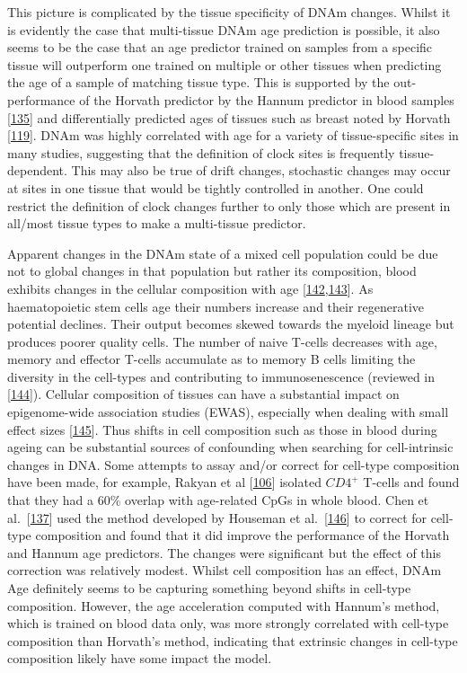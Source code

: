 \documentclass[
]{book}
\begin{document}
This picture is complicated by the tissue specificity of DNAm changes.
Whilst it is evidently the case that multi-tissue DNAm age prediction is possible, it also seems to be the case that an age predictor trained on samples from a specific tissue will outperform one trained on multiple or other tissues when predicting the age of a sample of matching tissue type.
This is supported by the out-performance of the Horvath predictor by the Hannum predictor in blood samples {[}\protect\hyperlink{ref-Marioni2015}{135}{]} and differentially predicted ages of tissues such as breast noted by Horvath {[}\protect\hyperlink{ref-Horvath2013}{119}{]}.
DNAm was highly correlated with age for a variety of tissue-specific sites in many studies, suggesting that the definition of clock sites is frequently tissue-dependent.
This may also be true of drift changes, stochastic changes may occur at sites in one tissue that would be tightly controlled in another.
One could restrict the definition of clock changes further to only those which are present in all/most tissue types to make a multi-tissue predictor.

Apparent changes in the DNAm state of a mixed cell population could be due not to global changes in that population but rather its composition, blood exhibits changes in the cellular composition with age {[}\protect\hyperlink{ref-Rimmele2014}{142},\protect\hyperlink{ref-Izzo2020}{143}{]}.
As haematopoietic stem cells age their numbers increase and their regenerative potential declines.
Their output becomes skewed towards the myeloid lineage but produces poorer quality cells.
The number of naive T-cells decreases with age, memory and effector T-cells accumulate as to memory B cells limiting the diversity in the cell-types and contributing to immunosenescence (reviewed in {[}\protect\hyperlink{ref-Geiger2013}{144}{]}).
Cellular composition of tissues can have a substantial impact on epigenome-wide association studies (EWAS), especially when dealing with small effect sizes {[}\protect\hyperlink{ref-Jaffe2014}{145}{]}.
Thus shifts in cell composition such as those in blood during ageing can be substantial sources of confounding when searching for cell-intrinsic changes in DNA.
Some attempts to assay and/or correct for cell-type composition have been made, for example, Rakyan et al {[}\protect\hyperlink{ref-Rakyan2010}{106}{]} isolated \(CD4^+\) T-cells and found that they had a 60\% overlap with age-related CpGs in whole blood. Chen et al.~{[}\protect\hyperlink{ref-Chen2016a}{137}{]} used the method developed by Houseman et al.~{[}\protect\hyperlink{ref-Houseman2012}{146}{]} to correct for cell-type composition and found that it did improve the performance of the Horvath and Hannum age predictors.
The changes were significant but the effect of this correction was relatively modest.
Whilst cell composition has an effect, DNAm Age definitely seems to be capturing something beyond shifts in cell-type composition.
However, the age acceleration computed with Hannum's method, which is trained on blood data only, was more strongly correlated with cell-type composition than Horvath's method, indicating that extrinsic changes in cell-type composition likely have some impact the model.
\end{document}
